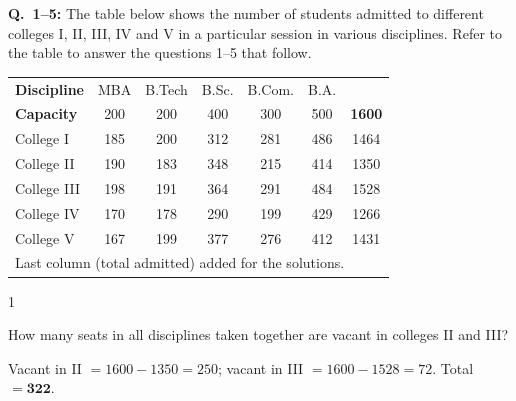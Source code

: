 \begin{context}
\textbf{Q.~1--5:} The table below shows the number of students admitted to different colleges I, II, III, IV and V in a particular session in various disciplines. Refer to the table to answer the questions 1--5 that follow.
\begin{center}\small
\begin{tabular}{lccccc|c}\toprule \textbf{Discipline} & MBA & B.Tech & B.Sc. & B.Com. & B.A. & \\
\textbf{Capacity} & 200 & 200 & 400 & 300 & 500 & \textbf{1600}\\\midrule
College I & 185 & 200 & 312 & 281 & 486 & 1464\\ College II & 190 & 183 & 348 & 215 & 414 & 1350\\ College III & 198 & 191 & 364 & 291 & 484 & 1528\\ College IV & 170 & 178 & 290 & 199 & 429 & 1266\\ College V & 167 & 199 & 377 & 276 & 412 & 1431\\\bottomrule
\multicolumn{7}{l}{\scriptsize Last column (total admitted) added for the solutions.}
\end{tabular}
\end{center}
\end{context}
\begin{question}{1}
{How many seats in all disciplines taken together are vacant in colleges II and III?\par}
\begin{explain}
Vacant in II $=1600-1350=250$; vacant in III $=1600-1528=72$. Total $=\mathbf{322}$.
\end{explain}
\end{question}

